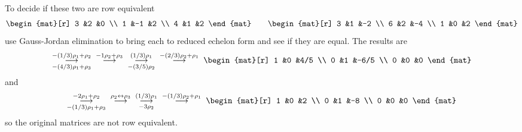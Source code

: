 \documentclass[10pt,t,serif,professionalfont]{beamer}
\begin{document}
\begin{frame}
\ex
To decide if these two are row equivalent
\begin{equation*}
  \begin{mat}[r]
    3  &2  &0  \\
    1  &-1 &2  \\
    4  &1  &2
  \end{mat}
  \qquad
  \begin{mat}[r]
    3  &1  &-2  \\
    6  &2  &-4  \\
    1  &0  &2   
  \end{mat}
\end{equation*}
use Gauss-Jordan elimination to bring each to reduced echelon form and
see if they are equal.
\pause
The results are 
\begin{equation*}
  \grstep[-(4/3)\rho_1+\rho_3]{-(1/3)\rho_1+\rho_2}\;
  \;\grstep{-1\rho_2+\rho_3}\;
  \;\grstep[-(3/5)\rho_2]{(1/3)\rho_1}\;
  \;\grstep{-(2/3)\rho_2+\rho_1}\;
  \begin{mat}[r]
    1  &0  &4/5  \\
    0  &1  &-6/5  \\
    0  &0  &0
  \end{mat}
\end{equation*}
and
\begin{equation*}
  \grstep[-(1/3)\rho_1+\rho_3]{-2\rho_1+\rho_2}\;
  \;\grstep{\rho_2\leftrightarrow\rho_3}\;
  \;\grstep[-3\rho_2]{(1/3)\rho_1}\;
  \;\grstep{-(1/3)\rho_2+\rho_1}\;
  \begin{mat}[r]
    1  &0  &2   \\
    0  &1  &-8  \\
    0  &0  &0   
  \end{mat}
\end{equation*}
so the original matrices are not row equivalent.
\end{frame}



% 
\end{document}

